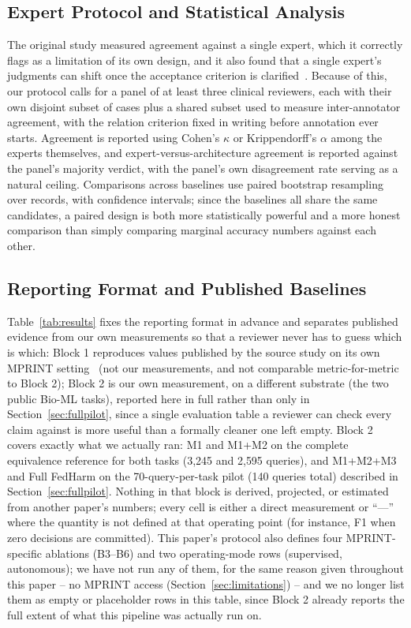 \documentclass[conference]{IEEEtran}
\begin{document}
\subsection{Expert Protocol and Statistical Analysis}

The original study measured agreement against a single expert, which it correctly flags as a limitation of its own design, and it also found that a single expert's judgments can shift once the acceptance criterion is clarified~\cite{b1}. Because of this, our protocol calls for a panel of at least three clinical reviewers, each with their own disjoint subset of cases plus a shared subset used to measure inter-annotator agreement, with the relation criterion fixed in writing before annotation ever starts. Agreement is reported using Cohen's $\kappa$ or Krippendorff's $\alpha$ among the experts themselves, and expert-versus-architecture agreement is reported against the panel's majority verdict, with the panel's own disagreement rate serving as a natural ceiling. Comparisons across baselines use paired bootstrap resampling over records, with confidence intervals; since the baselines all share the same candidates, a paired design is both more statistically powerful and a more honest comparison than simply comparing marginal accuracy numbers against each other.

\subsection{Reporting Format and Published Baselines}

Table~\ref{tab:results} fixes the reporting format in advance and separates published evidence from our own measurements so that a reviewer never has to guess which is which: Block 1 reproduces values published by the source study on its own MPRINT setting~\cite{b1} (not our measurements, and not comparable metric-for-metric to Block 2); Block 2 is our own measurement, on a different substrate (the two public Bio-ML tasks), reported here in full rather than only in Section~\ref{sec:fullpilot}, since a single evaluation table a reviewer can check every claim against is more useful than a formally cleaner one left empty. Block 2 covers exactly what we actually ran: M1 and M1+M2 on the complete equivalence reference for both tasks (3{,}245 and 2{,}595 queries), and M1+M2+M3 and Full FedHarm on the 70-query-per-task pilot (140 queries total) described in Section~\ref{sec:fullpilot}. Nothing in that block is derived, projected, or estimated from another paper's numbers; every cell is either a direct measurement or ``---'' where the quantity is not defined at that operating point (for instance, F1 when zero decisions are committed). This paper's protocol also defines four MPRINT-specific ablations (B3--B6) and two operating-mode rows (supervised, autonomous); we have not run any of them, for the same reason given throughout this paper -- no MPRINT access (Section~\ref{sec:limitations}) -- and we no longer list them as empty or placeholder rows in this table, since Block 2 already reports the full extent of what this pipeline was actually run on.
\end{document}
